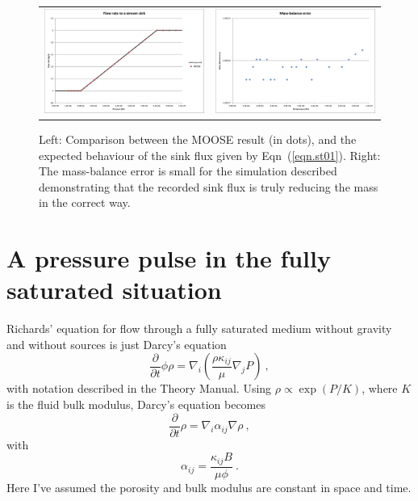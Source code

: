 \documentclass[]{scrreprt}
\begin{document}
\begin{figure}[htb]
\centering
\begin{tabular}{cc}
\includegraphics[width=7cm]{st01.eps} &
\includegraphics[width=7cm]{st01_mass_balance.eps}
\end{tabular}
\caption{Left: Comparison between the MOOSE result (in dots), and the
  expected behaviour of the sink flux given by Eqn~(\ref{eqn.st01}).
  Right: The mass-balance error is small for the simulation described
  demonstrating that the recorded sink flux is truly reducing the mass
  in the correct way.}
\label{st01.fig}
\end{figure}


\chapter{A pressure pulse in the fully saturated situation}
\label{pp}

Richards' equation for flow through a fully saturated medium without
gravity and without sources is just Darcy's equation
\begin{equation}
\frac{\partial}{\partial t}\phi\rho = \nabla_{i}\left(\frac{\rho
  \kappa_{ij}}{\mu} \nabla_{j}P \right) \ ,
\end{equation}
with notation described in the Theory Manual.  Using $\rho \propto
\exp(P/K)$, where $K$ is the fluid bulk modulus, Darcy's equation
becomes
\begin{equation}
\frac{\partial}{\partial t}\rho = \nabla_{i}\alpha_{ij}\nabla\rho \ ,
\end{equation}
with 
\begin{equation}
\alpha_{ij} = \frac{\kappa_{ij}B}{\mu\phi} \ .
\end{equation}
Here I've assumed the porosity and bulk modulus are constant in space
and time.
\end{document}
